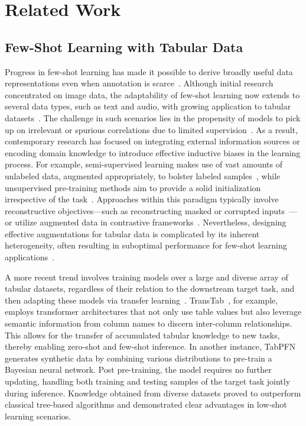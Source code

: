 \section{Related Work}

\subsection{Few-Shot Learning with Tabular Data} 

Progress in few-shot learning has made it possible to derive broadly useful data representations even when annotation is scarce~\cite{chen2018closer}. Although initial research concentrated on image data, the adaptability of few-shot learning now extends to several data types, such as text and audio, with growing application to tabular datasets~\cite{majumder2022few,nam2023stunt,schick2021exploiting}. The challenge in such scenarios lies in the propensity of models to pick up on irrelevant or spurious correlations due to limited supervision~\cite{bartlett2021deep}. As a result, contemporary research has focused on integrating external information sources or encoding domain knowledge to introduce effective inductive biases in the learning process. For example, semi-supervised learning makes use of vast amounts of unlabeled data, augmented appropriately, to bolster labeled samples~\cite{ucar2021subtab,yoon2020vime}, while unsupervised pre-training methods aim to provide a solid initialization irrespective of the task~\cite{somepalli2021saint}. Approaches within this paradigm typically involve reconstructive objectives—such as reconstructing masked or corrupted inputs~\cite{arik2021tabnet,majmundar2022met}—or utilize augmented data in contrastive frameworks~\cite{bahri2022scarf,chen2020simple}. Nevertheless, designing effective augmentations for tabular data is complicated by its inherent heterogeneity, often resulting in suboptimal performance for few-shot learning applications~\cite{nam2023stunt}.

A more recent trend involves training models over a large and diverse array of tabular datasets, regardless of their relation to the downstream target task, and then adapting these models via transfer learning~\cite{zhang2023generative,levin2022transfer,zhu2023xtab}. TransTab~\cite{wang2022transtab}, for example, employs transformer architectures that not only use table values but also leverage semantic information from column names to discern inter-column relationships. This allows for the transfer of accumulated tabular knowledge to new tasks, thereby enabling zero-shot and few-shot inference. In another instance, TabPFN~\cite{hollmann2022tabpfn} generates synthetic data by combining various distributions to pre-train a Bayesian neural network. Post pre-training, the model requires no further updating, handling both training and testing samples of the target task jointly during inference. Knowledge obtained from diverse datasets proved to outperform classical tree-based algorithms and demonstrated clear advantages in low-shot learning scenarios.

